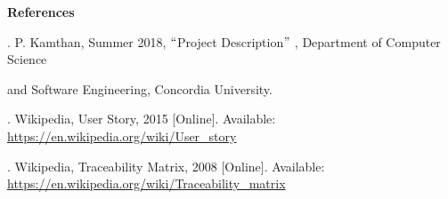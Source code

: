 \documentclass[12pt]{article}
\begin{document}


\vspace{\baselineskip}
{\fontsize{14pt}{16.8pt}\selectfont \textbf{References}\par}\par

{\fontsize{10pt}{12.0pt}\selectfont [1]. P. Kamthan, Summer 2018, $``$Project Description$"$ , Department of Computer Science\par}\par

{\fontsize{10pt}{12.0pt}\selectfont and Software Engineering, Concordia University.\par}\par

{\fontsize{10pt}{12.0pt}\selectfont [2]. Wikipedia, User Story, 2015 [Online]. Available: \href{https://en.wikipedia.org/wiki/User_story}{https://en.wikipedia.org/wiki/User\_story}\par}\par

{\fontsize{10pt}{12.0pt}\selectfont [3]. Wikipedia, Traceability Matrix, 2008 [Online]. Available: \href{https://en.wikipedia.org/wiki/Traceability_matrix}{https://en.wikipedia.org/wiki/Traceability\_matrix}\par}\par


\vspace{\baselineskip}
\begin{justify}
 
\end{justify}\par


\vspace{\baselineskip}

\printbibliography
\end{document}
